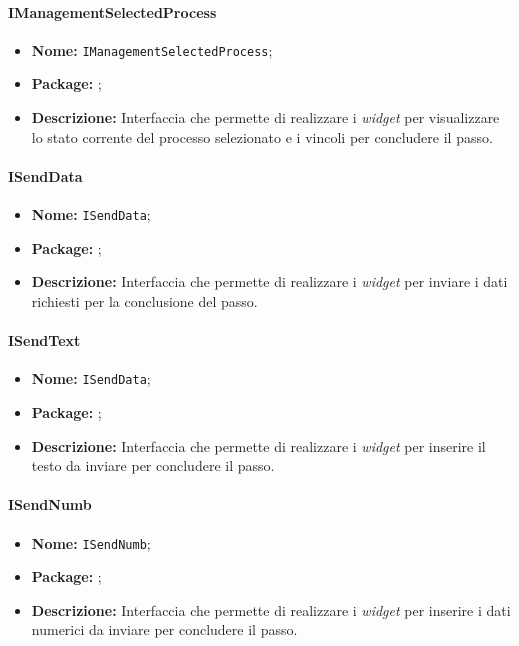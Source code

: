 \paragraph{IManagementSelectedProcess}
\begin{itemize}
\item \textbf{Nome:} \texttt{IManagementSelectedProcess};
\item \textbf{Package:} \texttt{\iViewUser{}};
\item \textbf{Descrizione:} Interfaccia che permette di realizzare i \textit{widget} per visualizzare lo stato corrente del processo selezionato e i vincoli per concludere il passo.
\end{itemize}

\paragraph{ISendData}
\begin{itemize}
\item \textbf{Nome:} \texttt{ISendData};
\item \textbf{Package:} \texttt{\iViewUser{}};
\item \textbf{Descrizione:} Interfaccia che permette di realizzare i \textit{widget} per inviare i dati richiesti per la conclusione del passo.
\end{itemize}

\paragraph{ISendText}
\begin{itemize}
\item \textbf{Nome:} \texttt{ISendData};
\item \textbf{Package:} \texttt{\iViewUser{}};
\item \textbf{Descrizione:} Interfaccia che permette di realizzare i \textit{widget} per inserire il testo da inviare per concludere il passo.
\end{itemize}

\paragraph{ISendNumb}
\begin{itemize}
\item \textbf{Nome:} \texttt{ISendNumb};
\item \textbf{Package:} \texttt{\iViewUser{}};
\item \textbf{Descrizione:} Interfaccia che permette di realizzare i \textit{widget} per inserire i dati numerici da inviare per concludere il passo.
\end{itemize}

